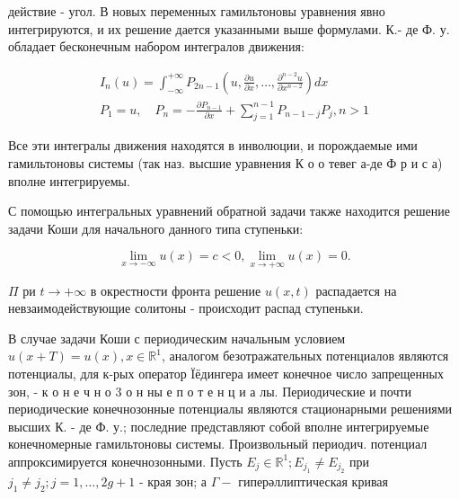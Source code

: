 \documentclass[10pt]{article}
\begin{document}
действие - угол. В новых переменных гамильтоновы уравнения явно интегрируются, и их решение дается указанными выше формулами. К.- де Ф. у. обладает бесконечным набором интегралов движения:



\[

\begin{gathered}

I_{n}(u)=\int_{-\infty}^{+\infty} P_{2 n-1}\left(u, \frac{\partial u}{\partial x}, \ldots, \frac{\partial^{n-2} u}{\partial x^{n-2}}\right) d x \\

P_{1}=u, \quad P_{n}=-\frac{\partial P_{n-1}}{\partial x}+\sum_{j=1}^{n-1} P_{n-1-j} P_{j}, n>1

\end{gathered}

\]



Все эти интегралы движения находятся в инволюции, и порождаемые ими гамильтоновы системы (так наз. высшие уравнения К о о тевег а-де Ф р и с а) вполне интегрируемы.



С помощью интегральных уравнений обратной задачи также находится решение задачи Коши для начального данного типа ступеньки:



\[

\lim _{x \rightarrow-\infty} u(x)=c<0, \lim _{x \rightarrow+\infty} u(x)=0 .

\]



$\Pi$ ри $t \rightarrow+\infty$ в окрестности фронта решение $u(x, t)$ распадается на невзаимодействующие солитоны - происходит распад ступеньки.



В случае задачи Коши с периодическим начальным условием $u(x+T)=u(x), x \in \mathbb{R}^{1}$, аналогом безотражательных потенциалов являются потенциалы, для к-рых оператор Ïёдингера имеет конечное число запрещенных зон, - к о н е ч н о 3 о н ны е п о т е н ц и а лы. Периодические и почти периодические конечнозонные потенциалы являются стационарными решениями высших К. - де Ф. у.; последние представляют собой вполне интегрируемые конечномерные гамильтоновы системы. Произвольный периодич. потенциал аппроксимируется конечнозонными. Пусть $E_{j} \in \mathbb{R}^{1} ; E_{j_{1}} \neq E_{j_{2}}$ при $j_{1} \neq j_{2} ; j=1, \ldots, 2 g+1$ - края зон; а $\Gamma-$ гиперәллиптическая кривая
\end{document}
